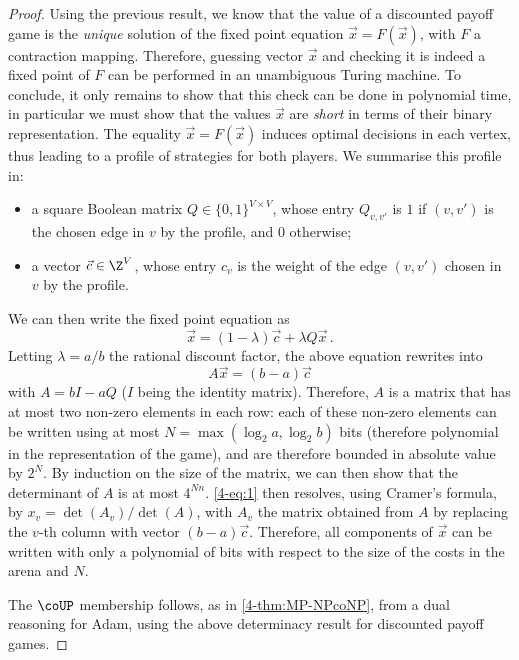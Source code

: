 \begin{proof}
  Using the previous result, we know that the value of a discounted
  payoff game is the \emph{unique} solution of the fixed point
  equation $\vec x = F(\vec x)$, with $F$ a contraction
  mapping. Therefore, guessing vector $\vec x$ and checking it is
  indeed a fixed point of $F$ can be performed in an unambiguous
  Turing machine. To conclude, it only remains to show that this check
  can be done in polynomial time, in particular we must show that the
  values $\vec x$ are \emph{short} in terms of their binary
  representation. The equality $\vec x = F(\vec x)$ induces optimal
  decisions in each vertex, thus leading to a profile of strategies
  for both players. We summarise this profile
  in: \begin{itemize} \item a square Boolean matrix
  $Q\in \{0,1\}^{V\times V}$, whose entry $Q_{v,v'}$ is $1$ if
  $(v,v')$ is the chosen edge in $v$ by the profile, and $0$
  otherwise; \item a vector $\vec c\in \Z^{V}$, whose entry $c_v$ is
  the weight of the edge $(v,v')$ chosen in $v$ by the
  profile.  \end{itemize} We can then write the fixed point equation
  as \[\vec x = (1-\lambda) \vec c + \lambda Q \vec x\,.\] Letting
  $\lambda = a/b$ the rational discount factor, the above equation
  rewrites into \begin{equation} A\vec x = (b-a)\vec
  c\label{4-eq:1} \end{equation} with $A= b I- a Q$ ($I$ being the
  identity matrix). Therefore, $A$ is a matrix that has at most two
  non-zero elements in each row: each of these non-zero elements can
  be written using at most $N=\max(\log_2 a,\log_2 b)$ bits (therefore
  polynomial in the representation of the game), and are therefore
  bounded in absolute value by $2^N$. By induction on the size of the
  matrix, we can then show that the determinant of $A$ is at most
  $4^{Nn}$. \cref{4-eq:1} then resolves, using Cramer's formula, by
  $x_v = \det (A_v) / \det (A)$, with $A_v$ the matrix obtained from
  $A$ by replacing the $v$-th column with vector $(b-a)\vec
  c$. Therefore, all components of $\vec x$ can be written with only a
  polynomial of bits with respect to the size of the costs in the
  arena and $N$.

  The $\coUP$ membership follows, as in \cref{4-thm:MP-NPcoNP}, from a
  dual reasoning for Adam, using the above determinacy result for
  discounted payoff games. 
\end{proof}

